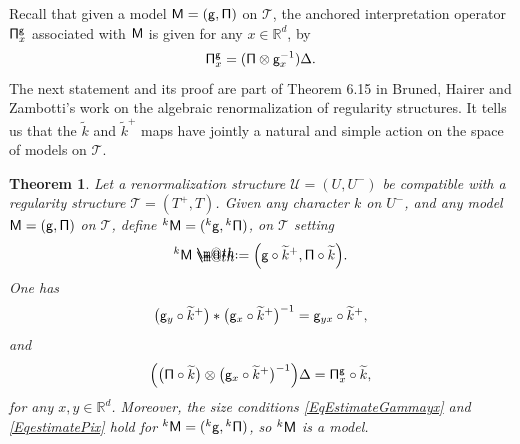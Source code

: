 \documentclass[10pt, reqno]{amsart}
\makeatletter
\numberwithin{subsection}{section}
\numberwithin{subsubsection}{subsection}
\numberwithin{equation}{section} %
\theoremstyle{mystyle}
\newtheorem{thm}{Theorem}
\theoremstyle{mystyle2}
\theoremstyle{mystyle3}
\newcommand{\ssk}{\smallskip}
\newcommand\bbR{\mathbb{R}}
\newcommand*{\defeq}{\mathrel{\rlap{%
                     \raisebox{0.3ex}{$\m@th\cdot$}}%
                     \raisebox{-0.3ex}{$\m@th\cdot$}}%
                     =}
\makeatother
\begin{document}
\ssk

Recall that given a model $\sf  M = (g,\Pi)$ on $\mathscr{T}$, the anchored interpretation operator ${\sf \Pi}_x^{\sf g}$ associated with $\sf M$ is given for any $x\in\bbR^d$, by 
$$
{\sf \Pi}_x^{\sf g} = ({\sf \Pi}\otimes {\sf g}_x^{-1})\Delta.
$$
The next statement and its proof are part of Theorem 6.15 in Bruned, Hairer and Zambotti's work \cite{BHZ} on the algebraic renormalization of regularity structures. It tells us that the $\widetilde{k}$ and $\widetilde{k}^+$ maps have jointly a natural and simple action on the space of models on $\mathscr{T}$.

\medskip

\begin{thm}   \label{ThmrenormalizationActionModels}
Let a renormalization structure $\mathscr{U}=(U,U^-)$ be compatible with a regularity structure $\mathscr{T}=(T^+,T)$. Given any character $k$ 
on $U^-$, and any model ${\sf M = (g,\Pi)}$ on $\mathscr{T}$, define $^k{\sf M}=({}^k{\sf g}, {}^k{\sf\Pi})$, on $\mathscr{T}$ setting 
\begin{equation}   \label{EqrenormalizedModel}
^k{\sf M} \defeq  \Big({\sf g}\circ \widetilde{k}^+, {\sf \Pi}\circ \widetilde{k}\Big).
\end{equation}
One has
\begin{equation}   \label{EqgRenorm}
\big({\sf g}_y\circ\widetilde{k}^+\big)*\big({\sf g}_x\circ\widetilde{k}^+\big)^{-1} = {\sf g}_{yx}\circ\widetilde{k}^+,
\end{equation}
and 
\begin{equation}   \label{EqPiXRenorm}
\Big(\big({\sf \Pi}\circ\widetilde{k}\big)\otimes\big({\sf g}_x\circ\widetilde{k}^+\big)^{-1}\Big)\Delta = {\sf \Pi}_x^{\sf g}\circ\widetilde{k},
\end{equation}
for any $x,y\in\bbR^d$. Moreover, the size conditions \eqref{EqEstimateGammayx} and \eqref{EqestimatePix} hold for $^k{\sf M}=({}^k{\sf g},{}^k{\sf\Pi})$, so $^k{\sf M}$ is a model.
\end{thm} 

\medskip
\end{document}
